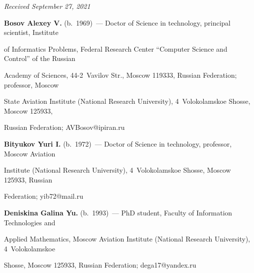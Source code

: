 \hfill{\small\textit{Received September 27, 2021}}















\Contr








\noindent


\textbf{Bosov Alexey V.} (b.\ 1969)~--- Doctor of Science in technology, principal scientist, Institute 


of Informatics Problems, Federal Research Center ``Computer Science and Control'' of the Russian 


Academy of Sciences, 44-2~Vavilov Str., Moscow 119333, Russian Federation; professor, Moscow 


State Aviation Institute (National Research University), 4~Volokolamskoe Shosse, Moscow 125933, 


Russian Federation; \mbox{AVBosov@ipiran.ru}








\vspace*{3pt}





\noindent


\textbf{Bityukov Yuri I.} (b.\ 1972)~--- Doctor of Science in technology, professor, Moscow Aviation 


Institute (National Research University), 4~Volokolamskoe Shosse, Moscow 125933, Russian 


Federation; \mbox{yib72@mail.ru}








\vspace*{3pt}





\noindent


\textbf{Deniskina Galina Yu.} (b.\ 1993)~--- PhD student, Faculty of Information Technologies and 


Applied Mathematics, Moscow Aviation Institute (National Research University), 4~Volokolamskoe 


Shosse, Moscow 125933, Russian Federation; \mbox{dega17@yandex.ru}





\label{end\stat}





\renewcommand{\bibname}{\protect\rm Литература} 


